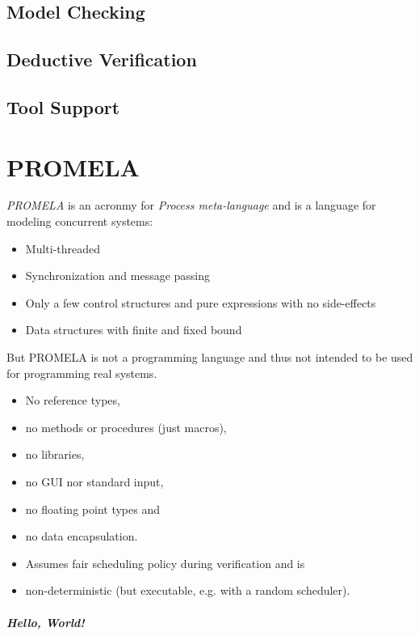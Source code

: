 \documentclass[a4paper, 11pt, accentcolor = tud3b]{tudreport}
\begin{document}
		\section{Model Checking} %

		\section{Deductive Verification} %

		\section{Tool Support} %

	\chapter{PROMELA}
		\textit{PROMELA} is an acronmy for \textit{Process meta-language} and is a language for modeling concurrent systems:
		\begin{itemize}
			\item Multi-threaded
			\item Synchronization and message passing
			\item Only a few control structures and pure expressions with no side-effects
			\item Data structures with finite and fixed bound
		\end{itemize}
		But PROMELA is not a programming language and thus not intended to be used for programming real systems.
		\begin{itemize}
			\item No reference types,
			\item no methods or procedures (just macros),
			\item no libraries,
			\item no GUI nor standard input,
			\item no floating point types and
			\item no data encapsulation.
			\item Assumes fair scheduling policy during verification and is
			\item non-deterministic (but executable, e.g. with a random scheduler).
		\end{itemize}
	
		\paragraph{Hello, World!}
			
\end{document}
